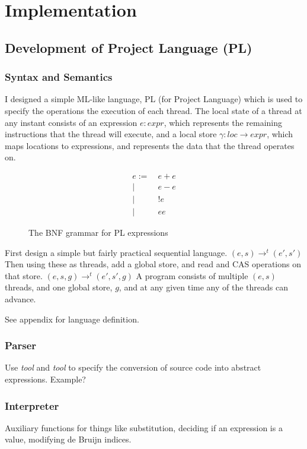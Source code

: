 \documentclass[12pt,a4paper,twoside,openright]{report}
\begin{document}
\chapter{Implementation}

\section{Development of Project Language (PL)}
\subsection{Syntax and Semantics}
I designed a simple ML-like language, PL (for 
Project Language) which
is used to specify the operations the execution
of each thread. The local state of a thread at
any instant consists of an expression
$e : \textit{expr}$, which
represents the remaining instructions that the
thread will execute, and a local store
$\gamma : \textit{loc} \to \textit{expr}$, which
maps locations to expressions, and represents the
data that the thread operates on.

\begin{figure}
	\begin{align*}
		e := &\ e + e \\
		\vert &\ e - e \\
		\vert &\ !e \\
		\vert &\ e e
	\end{align*}
	\caption{The BNF grammar for PL expressions}
\end{figure}

First design a simple but fairly practical sequential language.
$(e, s) \longrightarrow^t (e', s')$
Then using these as threads, add a global store, and read and CAS
operations on that store.
$(e, s, g) \longrightarrow^t (e', s', g)$
A program consists of multiple $(e, s)$ threads, and one global store,
$g$, and at any given time any of the threads can advance.

See appendix for language definition.

\subsection{Parser}
Use \emph{tool} and \emph{tool} to specify the conversion of source code
into abstract expressions. Example?

\subsection{Interpreter}
Auxiliary functions for things like substitution, deciding if
an expression is a value, modifying de Bruijn indices.
\end{document}
